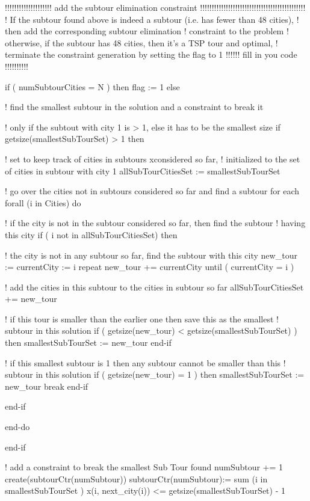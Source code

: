 \documentclass[twoside,12pt]{article}
\begin{document}
\begin{verbatim*}
	!!!!!!!!!!!!!!!!!!!! add the subtour elimination constraint !!!!!!!!!!!!!!!!!!!!!!!!!!!!!!!!!!!!!!!!!!!!!
	! If the subtour found above is indeed a subtour (i.e. has fewer than 48 cities), 
	! then add the corresponding subtour elimination
	!  constraint to the problem
	! otherwise, if the subtour has 48 cities, then it's a TSP tour and optimal, 
	! terminate the constraint generation by setting the flag to 1
	!!!!!! fill in you code !!!!!!!!!!
	
	if ( numSubtourCities = N ) then
	   flag := 1
	else

		! find the smallest subtour in the solution and a constraint to break it
			
		! only if the subtout with city 1 is > 1, else it has to be the smallest size
		if getsize(smallestSubTourSet) > 1 then
			
			! set to keep track of cities in subtours xconsidered so far,
			! initialized to the set of cities in subtour with city 1
			allSubTourCitiesSet := smallestSubTourSet
			
			! go over the cities not in subtours considered so far and find a subtour for each
			forall (i in Cities) do
			
			 ! if the city is not in the subtour considered so far, then find the subtour
			 ! having this city
			 if ( i not in allSubTourCitiesSet) then
				
				! the city is not in any subtour so far, find the subtour with this city
				new_tour := {}
				currentCity := i
				repeat
					new_tour += {currentCity}
				until ( currentCity = i ) 
				
				! add the cities in this subtour to the cities in subtour so far
				allSubTourCitiesSet += new_tour
				
				! if this tour is smaller than the earlier one  then save this as the smallest
				! subtour in this solution
				if ( getsize(new_tour) < getsize(smallestSubTourSet) ) then
					smallestSubTourSet := new_tour
				end-if
				
				! if this smallest subtour is 1 then any subtour cannot be smaller than this
				! subtour in this solution
				if ( getsize(new_tour) = 1 ) then
					smallestSubTourSet := new_tour
					break
				end-if
			 
			 end-if
			 
			end-do
			
		end-if
		
		! add a constraint to break the smallest Sub Tour found 
		numSubtour += 1
		create(subtourCtr(numSubtour))
		subtourCtr(numSubtour):= sum (i in smallestSubTourSet ) x(i, next_city(i)) <= getsize(smallestSubTourSet) - 1


\end{verbatim*}
\end{document}
